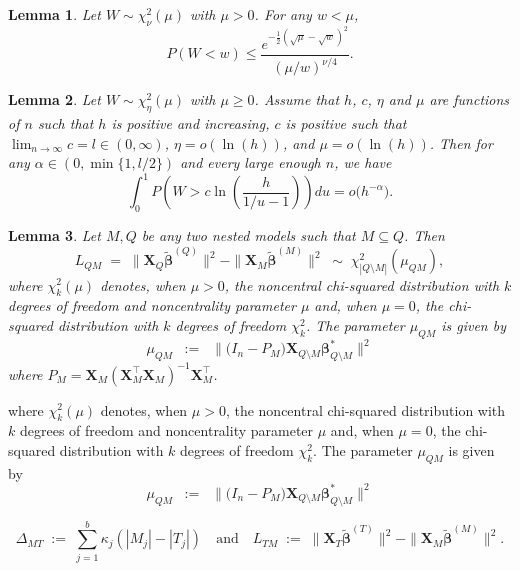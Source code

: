\documentclass[10pt,a4paper]{amsart}
\newtheorem{lem}{Lemma}
\newcommand{\bX}{\mathbf{X}}
\newcommand{\bbeta}{\boldsymbol{\beta}}
\begin{document}
\begin{lem}\label{lemma:s2} Let $W \sim \chi_\nu^2(\mu)$ with $\mu>0$. For any $w<\mu$, 
$$
P(W<w) \leq \frac{e^{-\frac{1}{2}(\sqrt{\mu}-\sqrt{w})^2}}{(\mu / w)^{\nu / 4}}.$$
\end{lem}

\begin{lem}\label{lemma:s20}
 Let $W\sim \chi_\eta^2(\mu)$ with $\mu \geq 0$. Assume that $h$, $c$, $\eta$ and $\mu$ are functions of $n$ such that $h$ is positive and increasing, $c$ is positive such that $\lim_{n\to\infty}c = l \in (0,\infty)$, $\eta=o(\ln(h))$, and $\mu=o(\ln(h))$. Then for any $\alpha\in(0,\min\{1,l/2\})$ and every large enough $n$, we have
$$
\int_0^1 P\left(W>c \ln \left(\frac{h}{1 / u-1}\right)\right) d u = o\big(  h^{-\alpha}\big).$$
\end{lem}

\begin{lem}\label{lemma:s7}
    Let $M,Q$ be any two nested models such that $M \subseteq Q$. Then
$$
L_{QM}\;=\;\|\bX_{Q}\tilde{\bbeta}^{(Q)}\|^2-\|\bX_{M}\tilde{\bbeta}^{(M)}\|^2\;\sim\; \chi_{|Q\setminus M|}^2\left(\mu_{Q M}\right), 
$$
where $\chi_{k}^2(\mu)$ denotes, when $\mu>0$, the noncentral chi-squared distribution with $k$ degrees of freedom and noncentrality parameter $\mu$ and, when $\mu=0$, the chi-squared distribution with $k$ degrees of freedom $\chi_{k}^2$. The parameter $\mu_{QM}$ is given by \begin{equation}\label{eq:muQM}
    \mu_{QM}\;\;:=\;\;\|\big(I_n-P_M\big) \bX_{Q\setminus M} \bbeta^*_{Q\setminus M}\|^2
\end{equation}
where $P_M=\bX_{M}\left(\bX_{M}^{\top} \bX_{M}\right)^{-1} \bX_{M}^{\top}$.
\end{lem}

where $\chi_{k}^2(\mu)$ denotes, when $\mu>0$, the noncentral chi-squared distribution with $k$ degrees of freedom and noncentrality parameter $\mu$ and, when $\mu=0$, the chi-squared distribution with $k$ degrees of freedom $\chi_{k}^2$. The parameter $\mu_{QM}$ is given by \begin{equation}
    \mu_{QM}\;\;:=\;\;\|\big(I_n-P_M\big) \bX_{Q\setminus M} \bbeta^*_{Q\setminus M}\|^2
\end{equation}

\begin{equation}\label{eq:DeltaM}
\Delta_{MT}\;:=\;\sum_{j=1}^b \kappa_j(|M_j|-|T_j|) \quad\text{and} \quad L_{TM}\;:=\;\|\bX_{T}\tilde{\bbeta}^{(T)}\|^2-\|\bX_{M}\tilde{\bbeta}^{(M)}\|^2.
\end{equation}
\end{document}
